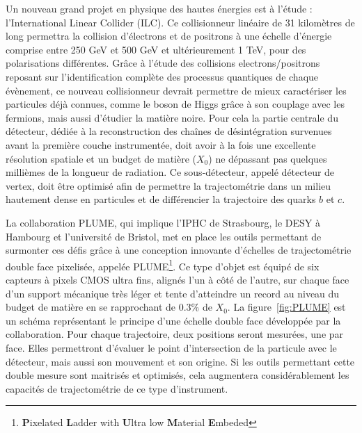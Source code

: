 \documentclass[a4papper, 10pt]{article}
\begin{document}
  Un nouveau grand projet en physique des hautes énergies est à l'étude : l'International Linear Collider (ILC). 
  Ce collisionneur linéaire de 31 kilomètres de long permettra la collision d'électrons et de positrons à une échelle d'énergie comprise entre 250 GeV et 500 GeV et ultérieurement 1 TeV, pour des polarisations différentes.
  Grâce à l'étude des collisions electrons/positrons reposant sur l'identification complète des processus quantiques de chaque évènement, ce nouveau collisionneur devrait permettre de mieux caractériser les particules déjà connues, comme le boson de Higgs grâce à son couplage avec les fermions, mais aussi d'étudier la matière noire.
  Pour cela la partie centrale du détecteur, dédiée à la reconstruction des chaînes de désintégration survenues avant la première couche instrumentée, doit avoir à la fois une excellente résolution spatiale et un budget de matière ($X_0$) ne dépassant pas quelques millièmes de la longueur de radiation. 
  Ce sous-détecteur, appelé détecteur de vertex, doit être optimisé afin de permettre la trajectométrie dans un milieu hautement dense en particules et de différencier la trajectoire des quarks $b$ et $c$.

  La collaboration PLUME, qui implique l'IPHC de Strasbourg, le DESY à Hambourg et l'université de Bristol, met en place les outils permettant de surmonter ces défis grâce à une conception innovante d'échelles de trajectométrie double face pixelisée, appelée PLUME\footnote{\textbf{P}ixelated \textbf{L}adder with \textbf{U}ltra low \textbf{M}aterial \textbf{E}mbeded}\cite{PLUME}. 
  Ce type d'objet est équipé de six capteurs à pixels CMOS ultra fins, alignés l'un à côté de l'autre, sur chaque face d'un support mécanique très léger et tente d'atteindre un record au niveau du budget de matière en se rapprochant de 0.3\% de $X_0$.
  La figure~\ref{fig:PLUME} est un schéma représentant le principe d'une échelle double face développée par la collaboration.
  Pour chaque trajectoire, deux positions seront mesurées, une par face. 
  Elles permettront d'évaluer le point d'intersection de la particule avec le détecteur, mais aussi son mouvement et son origine. 
  Si les outils permettant cette double mesure sont maitrisés et optimisés, cela augmentera considérablement les capacités de trajectométrie de ce type d'instrument.
\end{document}
